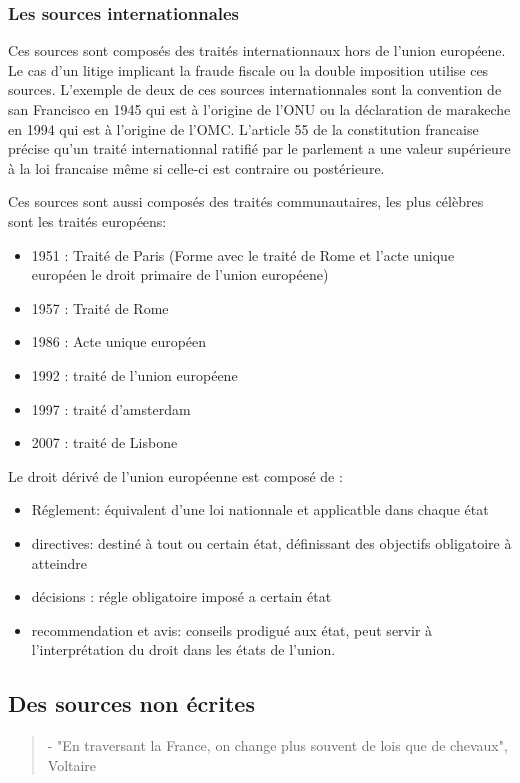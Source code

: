 \documentclass[a4paper]{article}
\begin{document}
				\subsubsection{Les sources internationnales}
					Ces sources sont composés des traités internationnaux hors de l'union européene. Le cas d'un litige implicant la fraude fiscale ou la double imposition utilise ces sources. L'exemple de deux de ces sources internationnales sont la convention de san Francisco en 1945 qui est à l'origine de l'ONU ou la déclaration de marakeche en 1994 qui est à l'origine de l'OMC. L'article 55 de la constitution francaise précise qu'un traité internationnal ratifié par le parlement a une valeur supérieure à la loi francaise même si celle-ci est contraire ou postérieure. 
					
					Ces sources sont aussi composés des traités communautaires, les plus célèbres sont les traités européens:
					\begin{itemize}
						\item 1951 : Traité de Paris (Forme avec le traité de Rome et l'acte unique européen le droit primaire de l'union européene)
						\item 1957 : Traité de Rome
						\item 1986 : Acte unique européen
						\item 1992 : traité de l'union européene
						\item 1997 : traité d'amsterdam
						\item 2007 : traité de Lisbone
					\end{itemize}
					
					Le droit dérivé de l'union européenne est composé de :
					\begin{itemize}
						\item Réglement: équivalent d'une loi nationnale et applicatble dans chaque état
						\item directives: destiné à tout ou certain état, définissant des objectifs obligatoire à atteindre
						\item décisions : régle obligatoire imposé a certain état
						\item recommendation et avis: conseils prodigué aux état, peut servir à l'interprétation du droit dans les états de l'union. 
					\end{itemize}
			\subsection{Des sources non écrites}			
				\begin{quote}
					- "En traversant la France, on change plus souvent de lois que de chevaux", Voltaire
				\end{quote}
\end{document}
